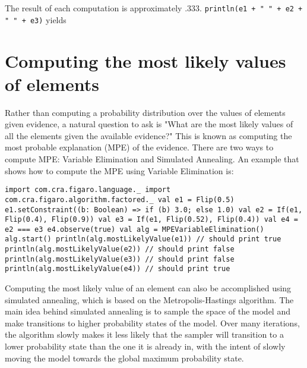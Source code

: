 The result of each computation is approximately .333. \texttt{println(e1 + " " + e2 + " " + e3)} yields 

\begin{flushleft}
    \texttt{0.3333333333333333 0.3338586042039474 0.3269}
  }
\end{flushleft}


\section{Computing the most likely values of elements}

Rather than computing a probability distribution over the values of elements given evidence, a natural question to ask is "What are the most likely values of all the elements given the available evidence?" This is known as computing the most probable explanation (MPE) of the evidence. There are two ways to compute MPE: Variable Elimination and Simulated Annealing. An example that shows how to compute the MPE using Variable Elimination is:

\begin{flushleft}
\texttt{import com.cra.figaro.language.\_
\newline import com.cra.figaro.algorithm.factored.\_
\newline 
\newline val e1 = Flip(0.5)
\newline e1.setConstraint((b: Boolean) => if (b) 3.0; else 1.0)
\newline val e2 = If(e1, Flip(0.4), Flip(0.9)) 
\newline val e3 = If(e1, Flip(0.52), Flip(0.4)) 
\newline val e4 = e2 === e3
\newline e4.observe(true)
\newline 
\newline val alg = MPEVariableElimination()
\newline alg.start()
\newline println(alg.mostLikelyValue(e1)) // should print true 
\newline println(alg.mostLikelyValue(e2)) // should print false 
\newline println(alg.mostLikelyValue(e3)) // should print false 
\newline println(alg.mostLikelyValue(e4)) // should print true
}
\end{flushleft}

Computing the most likely value of an element can also be accomplished using simulated annealing, which is based on the Metropolis-Hastings algorithm. The main idea behind simulated annealing is to sample the space of the model and make transitions to higher probability states of the model. Over many iterations, the algorithm slowly makes it less likely that the sampler will transition to a lower probability state than the one it is already in, with the intent of slowly moving the model towards the global maximum probability state.

